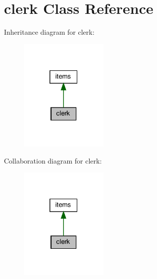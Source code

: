 \hypertarget{classclerk}{}\section{clerk Class Reference}
\label{classclerk}


Inheritance diagram for clerk\+:
\nopagebreak
\begin{figure}[H]
\begin{center}
\leavevmode
\includegraphics[width=121pt]{classclerk__inherit__graph}
\end{center}
\end{figure}


Collaboration diagram for clerk\+:
\nopagebreak
\begin{figure}[H]
\begin{center}
\leavevmode
\includegraphics[width=121pt]{classclerk__coll__graph}
\end{center}
\end{figure}
